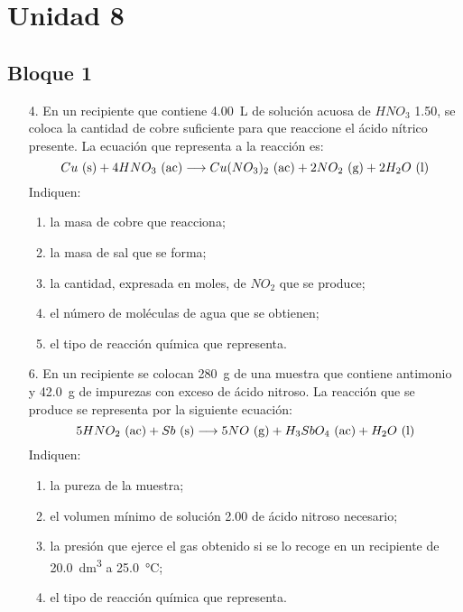 \documentclass[../Práctica.root.tex]{subfiles}
\begin{document}
\section{Unidad 8}
\subsection{Bloque 1}
\begin{enumerate}
    \item[4.] En un recipiente que contiene \SI{4,00}{\L} de solución acuosa de $HNO_3$ \SI{1,50}{\MR}, se coloca la
          cantidad de cobre suficiente para que reaccione el ácido nítrico presente. La ecuación que
          representa a la reacción es:
          \[ Cu \ \text{(s)} + 4 HNO_3 \ \text{(ac)} \longrightarrow{} Cu(NO_3)_2 \ \text{(ac)} + 2 NO_2 \ \text{(g)} + 2 H_2O \ \text{(l)} \]
          Indiquen:
          \begin{enumerate}
              \item la masa de cobre que reacciona;
              \item la masa de sal que se forma;
              \item la cantidad, expresada en moles, de $NO_2$ que se produce;
              \item el número de moléculas de agua que se obtienen;
              \item el tipo de reacción química que representa.
          \end{enumerate}

    \item[6.] En un recipiente se colocan \SI{280}{\g} de una muestra que contiene antimonio y \SI{42,0}{\g} de
          impurezas con exceso de ácido nitroso. La reacción que se produce se representa por la
          siguiente ecuación:
          \[ 5 HNO_2 \ \text{(ac)} + Sb \ \text{(s)} \longrightarrow{} 5 NO \ \text{(g)} + H_3SbO_4 \ \text{(ac)} + H_2O \ \text{(l)} \]
          Indiquen:
          \begin{enumerate}
              \item la pureza de la muestra;
              \item el volumen mínimo de solución \SI{2,00}{\MR} de ácido nitroso necesario;
              \item la presión que ejerce el gas obtenido si se lo recoge en un recipiente de \SI{20,0}{\dm\cubed} a \SI{25,0}{\celsius};
              \item el tipo de reacción química que representa.
          \end{enumerate}



\end{enumerate}
\end{document}
